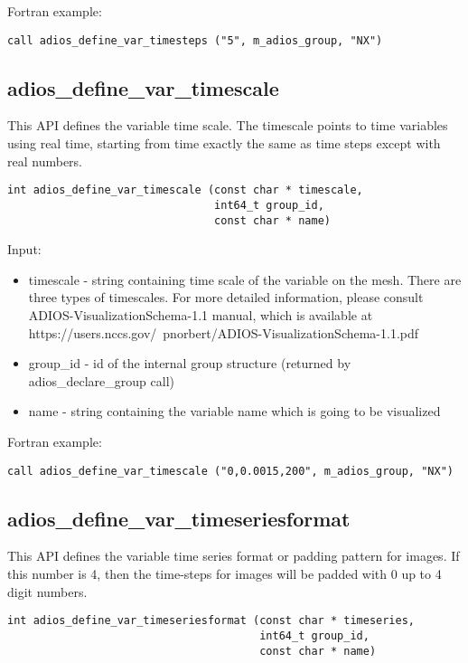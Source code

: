 Fortran example:
\begin{lstlisting}[alsolanguage=Fortran,caption={},label={}]
call adios_define_var_timesteps ("5", m_adios_group, "NX")
\end{lstlisting}


\subsection{adios\_define\_var\_timescale}
This API defines the variable time scale. The timescale points to time variables using real time, 
starting from time exactly the same as time steps except with real numbers. 

\begin{lstlisting}[alsolanguage=C,caption={},label={}]
int adios_define_var_timescale (const char * timescale, 
                                int64_t group_id, 
                                const char * name)
\end{lstlisting}

Input:
\begin{itemize}
\item timescale - string containing time scale of the variable on the mesh. There are three types of
timescales. For more detailed information, please consult ADIOS-VisualizationSchema-1.1 manual,
which is available at https://users.nccs.gov/~pnorbert/ADIOS-VisualizationSchema-1.1.pdf
\item group\_id - id of the internal group structure (returned by adios\_declare\_group call)
\item name - string containing the variable name which is going to be visualized
\end{itemize}

Fortran example:
\begin{lstlisting}[alsolanguage=Fortran,caption={},label={}]
call adios_define_var_timescale ("0,0.0015,200", m_adios_group, "NX")
\end{lstlisting}
                             

\subsection{adios\_define\_var\_timeseriesformat}
This API defines the variable time series format or padding pattern for images.
If this number is 4, then the time-steps for images will be padded with 0 up to 4 digit numbers.

\begin{lstlisting}[alsolanguage=C,caption={},label={}]
int adios_define_var_timeseriesformat (const char * timeseries, 
                                       int64_t group_id, 
                                       const char * name)
\end{lstlisting}

